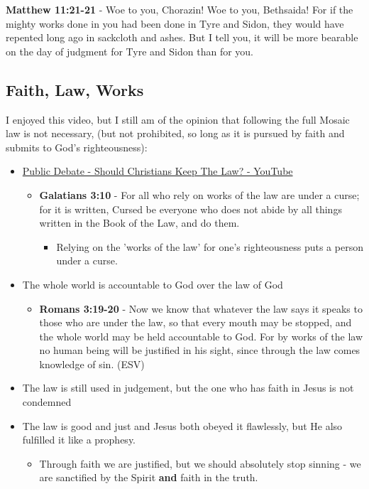 \documentclass[11pt]{article}
\begin{document}
\textbf{Matthew 11:21-21} - Woe to you, Chorazin! Woe to you, Bethsaida! For if the mighty works done in you had been done in Tyre and Sidon, they would have repented long ago in sackcloth and ashes. But I tell you, it will be more bearable on the day of judgment for Tyre and Sidon than for you.

\subsection{Faith, Law, Works}
\label{sec:orgf120b89}
I enjoyed this video, but I still am of the opinion that following the full Mosaic law is not necessary, (but not prohibited, so long as it is pursued by faith and submits to God's righteousness):
\begin{itemize}
\item \href{https://www.youtube.com/watch?v=CNHKqhwu6Bo}{Public Debate - Should Christians Keep The Law? - YouTube}
\begin{itemize}
\item \textbf{Galatians 3:10} - For all who rely on works of the law are under a curse; for it is written, Cursed be everyone who does not abide by all things written in the Book of the Law, and do them.
\begin{itemize}
\item Relying on the 'works of the law' for one's righteousness puts a person under a curse.
\end{itemize}
\end{itemize}
\item The whole world is accountable to God over the law of God
\begin{itemize}
\item \textbf{Romans 3:19-20} - Now we know that whatever the law says it speaks to those who are under the law, so that every mouth may be stopped, and the whole world may be held accountable to God. For by works of the law no human being will be justified in his sight, since through the law comes knowledge of sin. (ESV)
\end{itemize}
\item The law is still used in judgement, but the one who has faith in Jesus is not condemned
\item The law is good and just and Jesus both obeyed it flawlessly, but He also fulfilled it like a prophesy.
\begin{itemize}
\item Through faith we are justified, but we should absolutely stop sinning - we are sanctified by the Spirit \textbf{and} faith in the truth.

\end{itemize}
\end{itemize}
\end{document}
